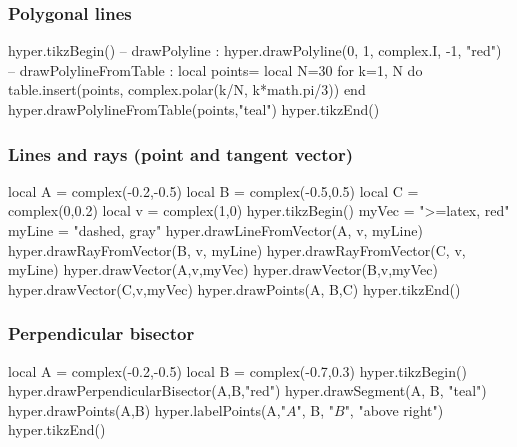\documentclass{article}
\begin{document}
\subsubsection{Polygonal lines}
\begin{codeandresult}
\begin{luacode*}
hyper.tikzBegin()
-- drawPolyline : 
hyper.drawPolyline(0, 1, complex.I, -1, "red")
-- drawPolylineFromTable : 
local points={}
local N=30
for k=1, N do
	table.insert(points, complex.polar(k/N, k*math.pi/3))
end
hyper.drawPolylineFromTable(points,"teal")
hyper.tikzEnd()
\end{luacode*}
\end{codeandresult}




\subsubsection{Lines and rays (point and tangent vector)}
\begin{codeandresult}
\begin{luacode*}
local A = complex(-0.2,-0.5)
local B = complex(-0.5,0.5)
local C = complex(0,0.2)
local v =  complex(1,0)
hyper.tikzBegin()
myVec = ">=latex, red"
myLine = "dashed, gray"
hyper.drawLineFromVector(A, v, myLine)
hyper.drawRayFromVector(B, v, myLine)
hyper.drawRayFromVector(C, v, myLine)
hyper.drawVector(A,v,myVec)
hyper.drawVector(B,v,myVec)
hyper.drawVector(C,v,myVec)
hyper.drawPoints(A, B,C)
hyper.tikzEnd()
\end{luacode*}
\end{codeandresult}






\subsubsection{Perpendicular bisector}
\begin{codeandresult}
\begin{luacode*}
local A = complex(-0.2,-0.5)
local B = complex(-0.7,0.3)
hyper.tikzBegin()
hyper.drawPerpendicularBisector(A,B,"red")
hyper.drawSegment(A, B, "teal")
hyper.drawPoints(A,B)
hyper.labelPoints(A,"$A$", B, "$B$", "above right")
hyper.tikzEnd()
\end{luacode*}
\end{codeandresult}
\end{document}
